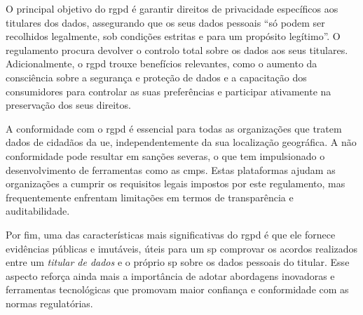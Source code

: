 O principal objetivo do \acrshort{rgpd} é garantir direitos de privacidade específicos aos titulares dos dados, assegurando que os seus dados pessoais “só podem ser recolhidos legalmente, sob condições estritas e para um propósito legítimo”. O regulamento procura devolver o controlo total sobre os dados aos seus titulares. Adicionalmente, o \acrshort{rgpd} trouxe benefícios relevantes, como o aumento da consciência sobre a segurança e proteção de dados e a capacitação dos consumidores para controlar as suas preferências e participar ativamente na preservação dos seus direitos.

A conformidade com o \acrshort{rgpd} é essencial para todas as organizações que tratem dados de cidadãos da \acrshort{ue}, independentemente da sua localização geográfica. A não conformidade pode resultar em sanções severas, o que tem impulsionado o desenvolvimento de ferramentas como as \acrshort{cmp}s. Estas plataformas ajudam as organizações a cumprir os requisitos legais impostos por este regulamento, mas frequentemente enfrentam limitações em termos de transparência e auditabilidade.

Por fim, uma das características mais significativas do \acrshort{rgpd} é que ele fornece evidências públicas e imutáveis, úteis para um \acrfull{sp} comprovar os acordos realizados entre um \textit{titular de dados} e o próprio \acrshort{sp} sobre os dados pessoais do titular. Esse aspecto reforça ainda mais a importância de adotar abordagens inovadoras e ferramentas tecnológicas que promovam maior confiança e conformidade com as normas regulatórias.




